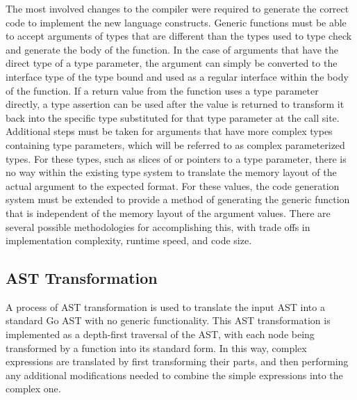 \documentclass[letterpaper,11pt]{article}
\begin{document}
The most involved changes to the compiler were required to generate the correct code to implement the new language constructs. Generic functions must be able to accept arguments of types that are different than the types used to type check and generate the body of the function. In the case of arguments that have the direct type of a type parameter, the argument can simply be converted to the interface type of the type bound and used as a regular interface within the body of the function. If a return value from the function uses a type parameter directly, a type assertion can be used after the value is returned to transform it back into the specific type substituted for that type parameter at the call site. Additional steps must be taken for arguments that have more complex types containing type parameters, which will be referred to as complex parameterized types. For these types, such as slices of or pointers to a type parameter, there is no way within the existing type system to translate the memory layout of the actual argument to the expected format. For these values, the code generation system must be extended to provide a method of generating the generic function that is independent of the memory layout of the argument values. There are several possible methodologies for accomplishing this, with trade offs in implementation complexity, runtime speed, and code size. 

\subsection{AST Transformation} \label{asttransformation}

A process of AST transformation is used to translate the input AST into a standard Go AST with no generic functionality. This AST transformation is implemented as a depth-first traversal of the AST, with each node being transformed by a function into its standard form. In this way, complex expressions are translated by first transforming their parts, and then performing any additional modifications needed to combine the simple expressions into the complex one.
\end{document}
